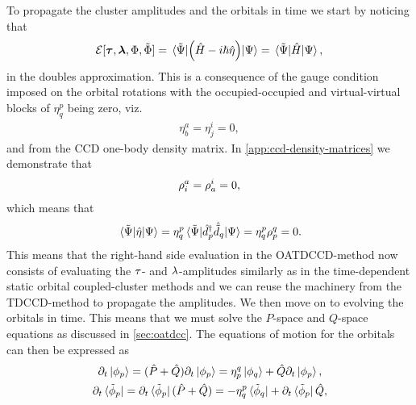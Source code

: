            To propagate the cluster amplitudes and the orbitals in time we
            start by noticing that
            \begin{align}
                \mathcal{E}[
                    \boldsymbol{\tau},
                    \boldsymbol{\lambda},
                    \Phi,
                    \tilde{\Phi}
                ]
                = \mel*{\tilde{\Psi}}{
                    \left( 
                        \hat{H}
                        - i\hslash\hat{\eta}
                     \right)
                }{\Psi}
                = \mel*{\tilde{\Psi}}{
                    \hat{H}
                }{\Psi},
            \end{align}
            in the doubles approximation.
            This is a consequence of the gauge condition imposed on the orbital
            rotations with the occupied-occupied and virtual-virtual blocks of
            $\eta^{p}_{q}$ being zero, viz.
            \begin{align}
                \eta^{a}_{b} = \eta^{i}_{j} = 0,
            \end{align}
            and from the CCD one-body density matrix.
            In \autoref{app:ccd-density-matrices} we demonstrate that
            \begin{align}
                \rho^{a}_{i} = \rho^{i}_{a} = 0,
            \end{align}
            which means that
            \begin{align}
                \mel*{\tilde{\Psi}}{\hat{\eta}}{\Psi}
                =
                \eta^{p}_{q}
                \mel*{\tilde{\Psi}}{\hat{d}^{\dagger}_{p}\hat{\tilde{d}}_{q}}{\Psi}
                = \eta^{p}_{q}\rho^{q}_{p}
                = 0.
            \end{align}
            This means that the right-hand side evaluation in the OATDCCD-method
            now consists of evaluating the $\tau$- and
            $\lambda$-amplitudes similarly as in the time-dependent static
            orbital coupled-cluster methods and we can reuse the machinery from
            the TDCCD-method to propagate the amplitudes.
            We then move on to evolving the orbitals in time.
            This means that we must solve the $P$-space and $Q$-space equations
            as discussed in \autoref{sec:oatdcc}.
            The equations of motion for the orbitals can then be expressed as
            \cite{kvaal2012ab}
            \begin{gather}
                \partial_t\ket*{\phi_p}
                = (\hat{P} + \hat{Q})\partial_t\ket*{\phi_p}
                = \eta^{q}_{p}\ket*{\phi_q}
                + \hat{Q}\partial_t\ket*{\phi_p},
                \\
                \partial_t\bra*{\tilde{\phi}_p}
                = \partial_t\bra*{\tilde{\phi}_p}(\hat{P} + \hat{Q})
                = -\eta^{p}_{q}\bra*{\tilde{\phi}_q}
                + \partial_t\bra*{\tilde{\phi}_p}\hat{Q},
            \end{gather}
